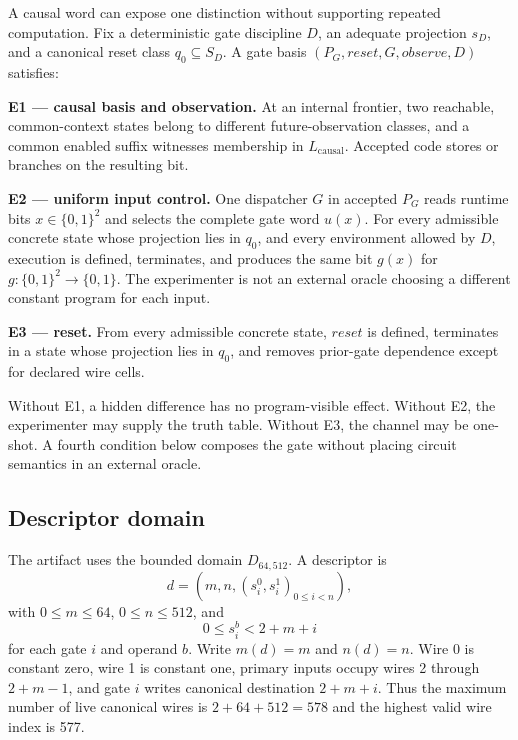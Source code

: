 \documentclass[conference]{IEEEtran}
\begin{document}
A causal word can expose one distinction without supporting repeated computation. Fix a deterministic gate discipline $D$, an adequate projection $s_D$, and a canonical reset class $q_0\subseteq S_D$. A gate basis $(P_G,\mathit{reset},G,\mathit{observe},D)$ satisfies:

\medskip
\noindent\textbf{E1 --- causal basis and observation.}
At an internal frontier, two reachable, common-context states belong to different future-observation classes, and a common enabled suffix witnesses membership in $L_{\mathrm{causal}}$. Accepted code stores or branches on the resulting bit.

\medskip
\noindent\textbf{E2 --- uniform input control.}
One dispatcher $G$ in accepted $P_G$ reads runtime bits $x\in\{0,1\}^2$ and selects the complete gate word $u(x)$. For every admissible concrete state whose projection lies in $q_0$, and every environment allowed by $D$, execution is defined, terminates, and produces the same bit $g(x)$ for $g:\{0,1\}^2\to\{0,1\}$. The experimenter is not an external oracle choosing a different constant program for each input.

\medskip
\noindent\textbf{E3 --- reset.}
From every admissible concrete state, $\mathit{reset}$ is defined, terminates in a state whose projection lies in $q_0$, and removes prior-gate dependence except for declared wire cells.

Without E1, a hidden difference has no program-visible effect. Without E2, the experimenter may supply the truth table. Without E3, the channel may be one-shot. A fourth condition below composes the gate without placing circuit semantics in an external oracle.

\subsection{Descriptor domain}

The artifact uses the bounded domain $D_{64,512}$. A descriptor is
\begin{equation}
d=(m,n,(s_i^0,s_i^1)_{0\le i<n}),
\end{equation}
with $0\le m\le64$, $0\le n\le512$, and
\begin{equation}
0\le s_i^b<2+m+i
\end{equation}
for each gate $i$ and operand $b$. Write $m(d)=m$ and $n(d)=n$. Wire 0 is constant zero, wire 1 is constant one, primary inputs occupy wires 2 through $2+m-1$, and gate $i$ writes canonical destination $2+m+i$. Thus the maximum number of live canonical wires is $2+64+512=578$ and the highest valid wire index is 577.
\end{document}
